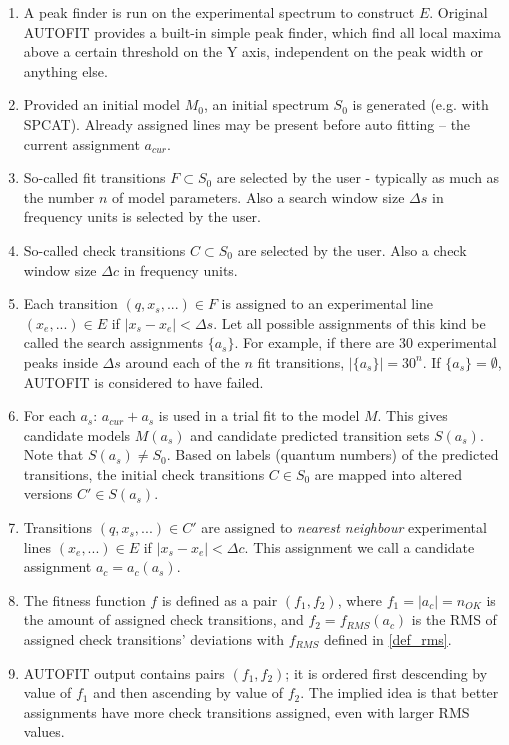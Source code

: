 \documentclass[11pt]{article}
\begin{document}
\begin{enumerate}
	\item A peak finder is run on the experimental spectrum to construct $E$. Original AUTOFIT provides a built-in simple peak finder, which find all local maxima above a certain threshold on the Y axis, independent on the peak width or anything else. 
	\item Provided an initial model $M_0$, an initial spectrum $S_0$ is generated (e.g. with SPCAT). Already assigned lines may be present before auto fitting -- the current assignment $a_{cur}$.
	\item So-called fit transitions $F \subset S_0$ are selected by the user - typically as much as the number $n$ of model parameters. Also a search window size $\Delta s$ in frequency units is selected by the user.
	\item So-called check transitions $C \subset S_0$ are selected by the user. Also a check window size $\Delta c$ in frequency units. 
	
		\item Each transition $(q, x_s, ...) \in F$ is assigned to an experimental line $(x_e, ...) \in E$ if $|x_s - x_e| < \Delta s$. Let all possible assignments of this kind be called the search assignments $\{a_s\}$. For example, if there are 30 experimental peaks inside $\Delta s$ around each of the $n$ fit transitions, $|\{a_s\}| = 30^{n}$. If $\{a_s\} = \emptyset$, AUTOFIT is considered to have failed. 
		\item For each $a_s$: $a_{cur} + a_s$ is used in a trial fit to the model $M$. This gives candidate models $M(a_s)$ and candidate predicted transition sets $S(a_s)$. Note that $S(a_s) \neq S_0$. Based on labels (quantum numbers) of the predicted transitions, the initial check transitions $C \in S_0$ are mapped into altered versions $C' \in S(a_s)$. 

		\item Transitions $(q, x_s, ...) \in C'$ are assigned to \emph{nearest neighbour} experimental lines $(x_e, ...) \in E$ if $|x_s - x_e| < \Delta c$. This assignment we call a candidate assignment $a_c = a_c(a_s)$. %
		
	\item The fitness function $f$ is defined as a pair $(f_1, f_2)$, where $f_1 = |a_c| = n_{OK}$ is the amount of assigned check transitions, and $f_2 = f_{RMS}(a_c)$ is the RMS of assigned check transitions' deviations with $f_{RMS}$ defined in \ref{def_rms}. 
	\item AUTOFIT output contains pairs $(f_1, f_2)$; it is ordered first descending by value of $f_1$ and then ascending by value of $f_2$. The implied idea is that better assignments have more check transitions assigned, even with larger RMS values. 
	

\end{enumerate}
\end{document}
